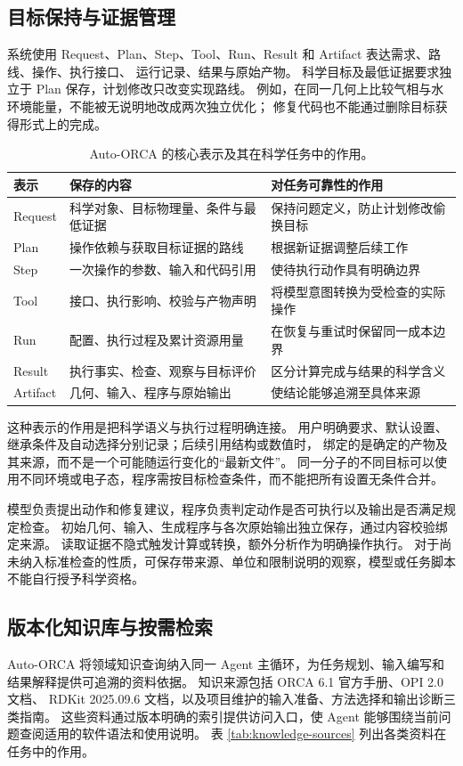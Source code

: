 \documentclass[UTF8,fontset=fandol,a4paper,11pt]{ctexart}
\begin{document}
\subsection{目标保持与证据管理}
系统使用 Request、Plan、Step、Tool、Run、Result 和 Artifact 表达需求、路线、操作、执行接口、%
运行记录、结果与原始产物。%
科学目标及最低证据要求独立于 Plan 保存，计划修改只改变实现路线。%
例如，在同一几何上比较气相与水环境能量，不能被无说明地改成两次独立优化；%
修复代码也不能通过删除目标获得形式上的完成。


\begin{table}[htbp]
  \centering\small
  \caption{Auto-ORCA 的核心表示及其在科学任务中的作用。%
  }
  \label{tab:domain-objects}
  \begin{tabularx}{\linewidth}{p{1.65cm}YY}
    \toprule
    表示 & 保存的内容 & 对任务可靠性的作用\\
    \midrule
    Request & 科学对象、目标物理量、条件与最低证据 & 保持问题定义，防止计划修改偷换目标\\
    Plan & 操作依赖与获取目标证据的路线 & 根据新证据调整后续工作\\
    Step & 一次操作的参数、输入和代码引用 & 使待执行动作具有明确边界\\
    Tool & 接口、执行影响、校验与产物声明 & 将模型意图转换为受检查的实际操作\\
    Run & 配置、执行过程及累计资源用量 & 在恢复与重试时保留同一成本边界\\
    Result & 执行事实、检查、观察与目标评价 & 区分计算完成与结果的科学含义\\
    Artifact & 几何、输入、程序与原始输出 & 使结论能够追溯至具体来源\\
    \bottomrule
  \end{tabularx}
\end{table}

这种表示的作用是把科学语义与执行过程明确连接。%
用户明确要求、默认设置、继承条件及自动选择分别记录；后续引用结构或数值时，%
绑定的是确定的产物及其来源，而不是一个可能随运行变化的“最新文件”。%
同一分子的不同目标可以使用不同环境或电子态，程序需按目标检查条件，而不能把所有设置无条件合并。

模型负责提出动作和修复建议，程序负责判定动作是否可执行以及输出是否满足规定检查。%
初始几何、输入、生成程序与各次原始输出独立保存，通过内容校验绑定来源。%
读取证据不隐式触发计算或转换，额外分析作为明确操作执行。%
对于尚未纳入标准检查的性质，可保存带来源、单位和限制说明的观察，模型或任务脚本不能自行授予科学资格。

\subsection{版本化知识库与按需检索}
\label{sec:knowledge-layer}
Auto-ORCA 将领域知识查询纳入同一 Agent 主循环，为任务规划、输入编写和结果解释提供可追溯的资料依据。%
知识来源包括 ORCA 6.1 官方手册\cite{orcamanual}、OPI 2.0 文档\cite{opi}、%
RDKit 2025.09.6 文档，以及项目维护的输入准备、方法选择和输出诊断三类指南。%
这些资料通过版本明确的索引提供访问入口，使 Agent 能够围绕当前问题查阅适用的软件语法和使用说明。%
表 \ref{tab:knowledge-sources} 列出各类资料在任务中的作用。
\end{document}
